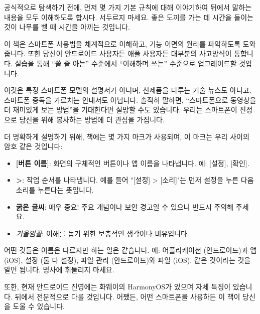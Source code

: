 
공식적으로 탐색하기 전에, 먼저 몇 가지 기본 규칙에 대해 이야기하여 뒤에서 말하는 내용을 모두 이해하도록 합시다. 서두르지 마세요. 좋은 도끼를 가는 데 시간을 들이는 것이 나무를 벨 때 시간을 아끼는 것입니다.


이 책은 스마트폰 사용법을 체계적으로 이해하고, 기능 이면의 원리를 파악하도록 도와줍니다. 또한 당신이 안드로이드 사용자든 애플 사용자든 대부분의 사고방식이 통합니다. 실습을 통해 “쓸 줄 아는” 수준에서 “이해하며 쓰는” 수준으로 업그레이드할 것입니다.

이것은 특정 스마트폰 모델의 설명서가 아니며, 신제품을 다루는 기술 뉴스도 아니고, 스마트폰 중독을 가르치는 안내서도 아닙니다. 솔직히 말하면, “스마트폰으로 동영상을 더 재미있게 보는 방법”을 기대한다면 실망할 수도 있습니다. 우리는 스마트폰이 진정으로 당신을 위해 봉사하는 방법에 더 관심을 가집니다.


더 명확하게 설명하기 위해, 책에는 몇 가지 마크가 사용되며, 이 마크는 우리 사이의 암호 같은 것입니다:

\begin{itemize}
  \item \textbf{[버튼 이름]}: 화면의 구체적인 버튼이나 앱 이름을 나타냅니다. 예: [설정], [확인].
  \item \textbf{>}: 작업 순서를 나타냅니다. 예를 들어 "[설정] > [소리]"는 먼저 설정을 누른 다음 소리를 누른다는 뜻입니다.
  \item \textbf{굵은 글씨}: 매우 중요! 주요 개념이나 보안 경고일 수 있으니 반드시 주의해 주세요.
  \item \emph{기울임꼴}: 이해를 돕기 위한 보충적인 생각이나 비유입니다.
\end{itemize}


어떤 것들은 이름은 다르지만 하는 일은 같습니다. 예: 어플리케이션 (안드로이드)과 앱 (iOS), 설정 (둘 다 설정), 파일 관리 (안드로이드)와 파일 (iOS). 같은 것이라는 것을 알면 됩니다. 명사에 휘둘리지 마세요.

또한, 현재 안드로이드 진영에는 화웨이의 HarmonyOS가 있으며 자체 특징이 있습니다. 뒤에서 전문적으로 다룰 것입니다. 어쨌든, 어떤 스마트폰을 사용하든 이 책이 당신을 도울 수 있습니다.


